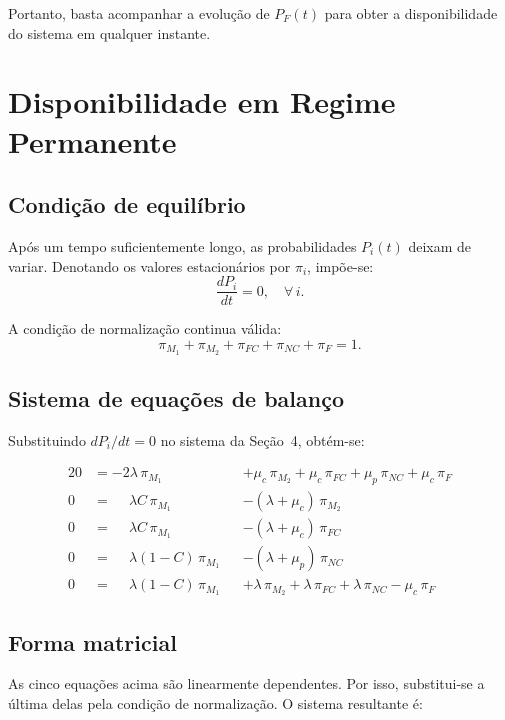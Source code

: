 \documentclass[12pt]{article}
\begin{document}
Portanto, basta acompanhar a evolução de $P_F(t)$ para obter a
disponibilidade do sistema em qualquer instante.

\newpage
\section{Disponibilidade em Regime Permanente}

\subsection*{Condição de equilíbrio}

Após um tempo suficientemente longo, as probabilidades $P_i(t)$ deixam de
variar. Denotando os valores estacionários por $\pi_i$, impõe-se:
\[
    \frac{dP_i}{dt} = 0, \quad \forall\, i.
\]

A condição de normalização continua válida:
\[
    \pi_{M_1} + \pi_{M_2} + \pi_{FC} + \pi_{NC} + \pi_F = 1.
\]

\subsection*{Sistema de equações de balanço}

Substituindo $dP_i/dt = 0$ no sistema da Seção~4, obtém-se:

\begin{alignat*}{2}
0 &= -2\lambda\,\pi_{M_1}
    &&+ \mu_c\,\pi_{M_2} + \mu_c\,\pi_{FC} + \mu_p\,\pi_{NC} + \mu_c\,\pi_F \\[4pt]
0 &= \phantom{-}\lambda C\,\pi_{M_1}
    &&- (\lambda + \mu_c)\,\pi_{M_2} \\[4pt]
0 &= \phantom{-}\lambda C\,\pi_{M_1}
    &&- (\lambda + \mu_c)\,\pi_{FC} \\[4pt]
0 &= \phantom{-}\lambda(1-C)\,\pi_{M_1}
    &&- (\lambda + \mu_p)\,\pi_{NC} \\[4pt]
0 &= \phantom{-}\lambda(1-C)\,\pi_{M_1}
    &&+ \lambda\,\pi_{M_2} + \lambda\,\pi_{FC} + \lambda\,\pi_{NC} - \mu_c\,\pi_F
\end{alignat*}

\subsection*{Forma matricial}

As cinco equações acima são linearmente dependentes. Por isso, substitui-se
a última delas pela condição de normalização. O sistema resultante é:
\end{document}
